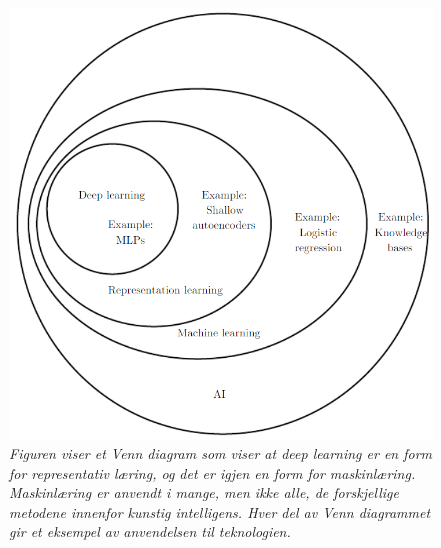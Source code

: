 \begin{figure} 
\begin{center} 
\includegraphics[scale=0.7]{figures/ai}
\caption{\small \sl Figuren viser et Venn diagram som viser at deep learning er en form for representativ læring, og det er igjen en form for maskinlæring. Maskinlæring er anvendt i mange, men ikke alle, de forskjellige metodene innenfor kunstig intelligens. Hver del av Venn diagrammet gir et eksempel av anvendelsen til teknologien. \cite{Goodfellow m.fl. 2016 s. 9} \label{fig:ai}} 
\end{center} 
\end{figure} 


